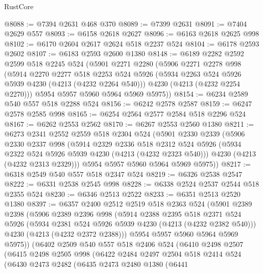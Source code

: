 \begin{lexlean}{RustCore}
\begin{coremodule}
@8088 := @7394 @2631 @468 @370
@8089 := @7399 @2631
@8091 := @7404 @2629 @557
@8093 := @6158 @2618 @2627
@8096 := @6163 @2618 @2625 @998
@8102 := @6170 @2604 @2617 @2624 @518 @2237 @524
@8104 := @6178 @2593 @2602
@8107 := @6183 @2593 @2600 @1380
@8148 := @6189
    @2282
    @2592
    @2599
    @518
    @2245
    @524
    (@5901
      @2271
      @2280
      (@5906
        @2271
        @2278
        @998
        (@5914
          @2270
          @2277
          @518
          @2253
          @524
          @5926
          (@5934 @2263 @524 @5926 @5939 @4230 (@4213 (@4232 @2264 @540)))
          @4230
          (@4213 (@4232 @2254 @2270)))
        @5954
        @5957
        @5960
        @5964
        @5969
        @5975))
@8154 := @6234 @2589 @540 @557 @518 @2288 @524
@8156 := @6242 @2578 @2587
@8159 := @6247 @2578 @2585 @998
@8165 := @6254 @2564 @2577 @2584 @518 @2296 @524
@8167 := @6262 @2553 @2562
@8170 := @6267 @2553 @2560 @1380
@8211 := @6273
    @2341
    @2552
    @2559
    @518
    @2304
    @524
    (@5901
      @2330
      @2339
      (@5906
        @2330
        @2337
        @998
        (@5914
          @2329
          @2336
          @518
          @2312
          @524
          @5926
          (@5934 @2322 @524 @5926 @5939 @4230 (@4213 (@4232 @2323 @540)))
          @4230
          (@4213 (@4232 @2313 @2329)))
        @5954
        @5957
        @5960
        @5964
        @5969
        @5975))
@8217 := @6318 @2549 @540 @557 @518 @2347 @524
@8219 := @6326 @2538 @2547
@8222 := @6331 @2538 @2545 @998
@8228 := @6338 @2524 @2537 @2544 @518 @2355 @524
@8230 := @6346 @2513 @2522
@8233 := @6351 @2513 @2520 @1380
@8397 := @6357
    @2400
    @2512
    @2519
    @518
    @2363
    @524
    (@5901
      @2389
      @2398
      (@5906
        @2389
        @2396
        @998
        (@5914
          @2388
          @2395
          @518
          @2371
          @524
          @5926
          (@5934 @2381 @524 @5926 @5939 @4230 (@4213 (@4232 @2382 @540)))
          @4230
          (@4213 (@4232 @2372 @2388)))
        @5954
        @5957
        @5960
        @5964
        @5969
        @5975))
    (@6402
      @2509
      @540
      @557
      @518
      @2406
      @524
      (@6410
        @2498
        @2507
        (@6415
          @2498
          @2505
          @998
          (@6422
            @2484
            @2497
            @2504
            @518
            @2414
            @524
            (@6430
              @2473
              @2482
              (@6435
                @2473
                @2480
                @1380
                (@6441

\end{coremodule}
\end{lexlean}
